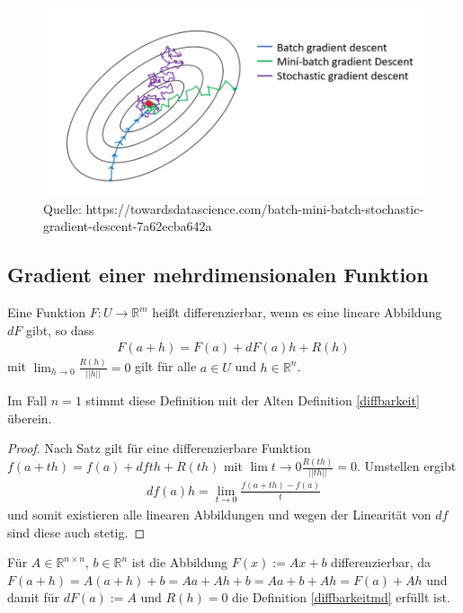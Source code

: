 \begin{figure}[H]
      \centering
    \includegraphics[width=1.0\textwidth]{images/batchgradient}
      \caption{Quelle: https://towardsdatascience.com/batch-mini-batch-stochastic-gradient-descent-7a62ecba642a}
\end{figure}


\subsection{Gradient einer  mehrdimensionalen Funktion}
\begin{Definition}
\label{diffbarkeitmd}
Eine Funktion $F: U \to \mathbb{R}^m$ heißt differenzierbar, wenn es eine lineare Abbildung $dF$ gibt, so dass 
\begin{align*}
F(a + h) = F(a) + dF(a)h + R(h)
\end{align*}
mit $\lim_{h \to 0} \frac{R(h)}{||h||} = 0$ gilt für alle $a \in U$ und $h \in \mathbb{R}^n$.
\end{Definition}

\begin{Bemerkung}
Im Fall $n = 1$ stimmt diese Definition mit der Alten Definition \ref{diffbarkeit} überein.
\end{Bemerkung}
\begin{proof}
Nach Satz \label{lokaleLinearisierung} gilt für eine differenzierbare Funktion $f(a + th) = f(a) + df th + R(th)$ mit  $\lim{t \to 0} \frac{R(th)}{||th||} = 0$. Umstellen ergibt
\begin{align*}
df(a) h = \lim_{t \to 0} \frac{f(a + th) - f(a)}{t}
\end{align*} 
und somit existieren alle linearen Abbildungen und wegen der Linearität von $df$ sind diese auch stetig.
\end{proof}

\begin{Beispiel}
Für $A \in \mathbb{R}^{n \times n}$, $b \in \mathbb{R}^n$  ist die Abbildung $F(x) := Ax +b$ differenzierbar, da
$F(a +h) = A(a+h) + b = A a+ Ah +b = Aa +b + Ah = F(a) + Ah$ und damit für $dF(a) := A$ und $R(h) = 0$ die Definition \ref{diffbarkeitmd}
 erfüllt ist.
\end{Beispiel}

